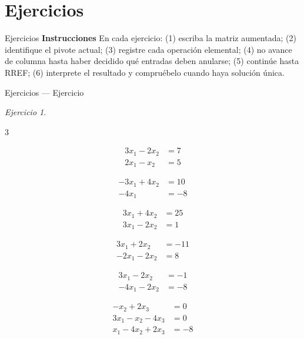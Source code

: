 \documentclass[aspectratio=169,11pt]{beamer}
\theoremstyle{remark}
\newtheorem{Ejer}[definicion]{Ejercicio}
\begin{document}
\section{Ejercicios}
\begin{frame}[allowframebreaks]{Ejercicios}
\footnotesize
\textbf{Instrucciones} En cada ejercicio: (1) escriba la matriz aumentada; (2) identifique
el pivote actual; (3) registre cada operación elemental; (4) no avance de columna hasta haber decidido qué entradas deben anularse; (5) continúe hasta RREF; (6) interprete el resultado y compruébelo cuando haya solución única.
\end{frame}

\begin{frame}[shrink=5]{Ejercicios — Ejercicio}
\footnotesize
\begin{Ejer}

\begin{enumerate}
\begin{multicols}{3}
\item \[
\begin{aligned}
3 x_{1} - 2 x_{2} &= 7\\
2 x_{1} - x_{2} &= 5
\end{aligned}
\]
\item 
\[
\begin{aligned}
- 3 x_{1} + 4 x_{2} &= 10\\
- 4 x_{1} &= -8
\end{aligned}
\]
\item
\[
\begin{aligned}
3 x_{1} + 4 x_{2} &= 25\\
3 x_{1} - 2 x_{2} &= 1
\end{aligned}
\]
\item \[
\begin{aligned}
3 x_{1} + 2 x_{2} &= -11\\
- 2 x_{1} - 2 x_{2} &= 8
\end{aligned}
\]
\item \[
\begin{aligned}
3 x_{1} - 2 x_{2} &= -1\\
- 4 x_{1} - 2 x_{2} &= -8
\end{aligned}
\]
\item \[
\begin{aligned}
- x_{2} + 2 x_{3} &= 0\\
3 x_{1} - x_{2} - 4 x_{3} &= 0\\
x_{1} - 4 x_{2} + 2 x_{3} &= -8
\end{aligned}
\]
\end{multicols}
\end{enumerate}

\end{Ejer}
\end{frame}
\end{document}
